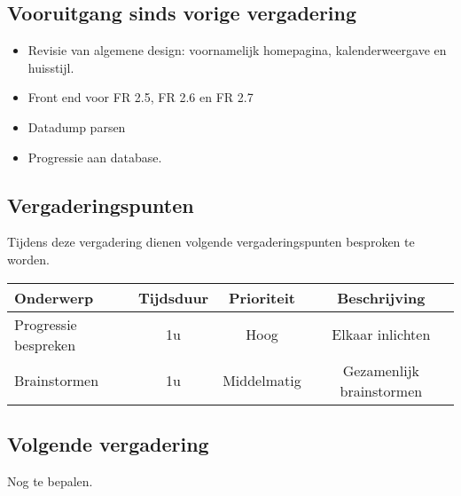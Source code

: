 \subsection{Vooruitgang sinds vorige vergadering}
\begin{itemize}
	\item Revisie van algemene design: voornamelijk homepagina, kalenderweergave en huisstijl.
	\item Front end voor FR 2.5, FR 2.6 en FR 2.7
	\item Datadump parsen
	\item Progressie aan database.
\end{itemize}

\subsection{Vergaderingspunten}
Tijdens deze vergadering dienen volgende vergaderingspunten besproken te worden.
\begin{table} [H]
	\centering
	\begin{tabular} {l|c|c|c}
		Onderwerp & Tijdsduur & Prioriteit & Beschrijving \\ %
		\hline
		Progressie bespreken & 1u & Hoog & Elkaar inlichten \\
		Brainstormen & 1u & Middelmatig & Gezamenlijk brainstormen \\
	\end{tabular}
\end{table}

\subsection{Volgende vergadering}
Nog te bepalen.
